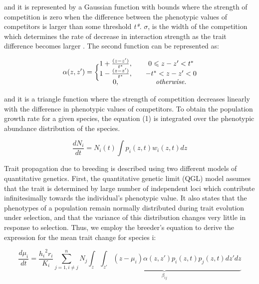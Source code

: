 \documentclass[12pt]{article}
\begin{document}
and it is represented by a Gaussian function with bounds where the strength of competition is zero when the difference between the phenotypic values of competitors is larger than some threshold \emph{t*}. $\sigma$, is the width of the competition which determines the rate of decrease in interaction strength as the trait difference becomes larger \cite{Nuismer&Harmon:2015,barabas2016effect}. The second function can be represented as:

\begin{linenomath*}
\begin{equation}
\alpha(z,z') = \biggl\{
\begin{matrix}
1+\frac{(z-z')}{t^*}, & & 0 \leqslant z-z' < t^*
\\
1-\frac{(z-z')}{t^*}, & & -t^* < z-z' < 0
\\
0, &  & \text{\emph{otherwise.}}
\end{matrix}
\label{kernel2}
\end{equation}
\end{linenomath*}
and it is a triangle function where the strength of competition decreases linearly with the difference in phenotypic values of competitors. To obtain the population growth rate for a given species, the equation (1) is integrated over the phenotypic abundance distribution of the species.

\begin{linenomath*}
\begin{equation}
\frac{dN_i}{dt}=N_i(t)\int p_i(z,t)w_i(z,t)dz
\label{size}
\end{equation}
\end{linenomath*}

Trait propagation due to breeding is described using two different models of quantitative genetics. First, the quantitative genetic limit (QGL) model assumes that the trait is determined by large number of independent loci which contribute infinitesimally towards the individual’s phenotypic value. It also states that the phenotypes of a population remain normally distributed during trait evolution under selection, and that the variance of this distribution changes very little in response to selection. Thus, we employ the breeder's equation to derive the expression for the mean trait change for species i:

\begin{linenomath*}
\begin{equation}
\frac{d\mu_i}{dt}=\frac{{h_i}^2 r_i}{K_i}\sum \limits_{j=1,i	\neq j}^{n}N_j\underbrace{ \int_z \int_{z'}(z-\mu_i)\alpha(z,z')p_i(z,t)p_j(z,t)dz'dz}_{\beta_{ij}}
\label{mean}
 \end{equation}
\end{linenomath*}
\end{document}
